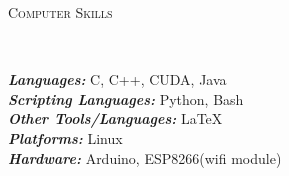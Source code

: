 \documentclass[10pt]{article}
\newenvironment{changemargin}[2]{%
    \begin{list}{}{%
            \setlength{\topsep}{0pt}%
            \setlength{\leftmargin}{#1}%
            \setlength{\rightmargin}{#2}%
            \setlength{\listparindent}{\parindent}%
        \setlength{\itemindent}{\parindent}%
            \setlength{\parsep}{\parskip}%
        }%
\item[]}{\end{list}
}
\newcommand{\lineover}{
    \begin{changemargin}{-0.05in}{-0.10in}
        \vspace*{-8pt}
        \hrulefill \\
        \vspace*{-2pt}
    \end{changemargin}
}
\newcommand{\header}[1]{
    \begin{changemargin}{-0.75in}{-0.75in}
        \scshape{#1}\\
        \lineover
    \end{changemargin}
}
\newenvironment{body} {
    \vspace*{-16pt}
    \begin{changemargin}{-0.6in}{-0.65in}
    }   
    {\end{changemargin}
}
\begin{document}


\smallskip
\header{Computer Skills}

\begin{body}
    \vspace{14pt}
    \emph{\textbf{Languages:}}{} C, C++, CUDA, Java\\
    \emph{\textbf{Scripting Languages:}}{} Python, Bash\\
    \emph{\textbf{Other Tools/Languages:}}{} \LaTeX\\
    \emph{\textbf{Platforms:}}{} Linux\\
    \emph{\textbf{Hardware:}}{} Arduino, ESP8266(wifi module)
\end{body}

\end{document}
